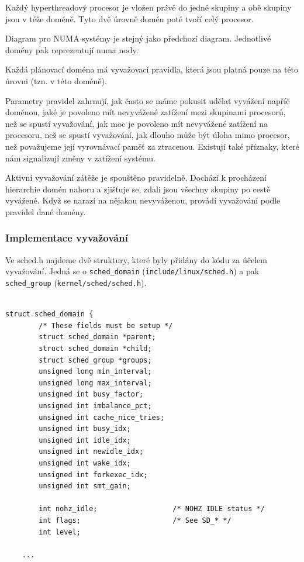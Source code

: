 \documentclass[a4paper,12pt]{article}
\begin{document}
Každý hyperthreadový procesor je vložen právě do jedné skupiny a obě skupiny jsou v téže doméně. Tyto dvě úrovně domén poté tvoří celý procesor. 

Diagram pro NUMA systémy je stejný jako předchozí diagram. Jednotlivé domény pak reprezentují numa nody. 


Každá plánovací doména má vyvažovací pravidla, která jsou platná pouze na této úrovni (tzn. v této doméně). 

Parametry pravidel zahrnují, jak často se máme pokusit udělat vyvážení napříč doménou, jaké je povoleno mít nevyvážené zatížení mezi skupinami procesorů, než se spustí vyvažování, jak moc je povoleno mít nevyvážené zatížení na procesoru, než se spustí vyvažování, jak dlouho může být úloha mimo procesor, než považujeme její vyrovnávací paměť za ztracenou.
Existují také příznaky, které nám signalizují změny v zatížení systému. 

Aktivní vyvažování zátěže je spouštěno pravidelně. Dochází k procházení hierarchie domén nahoru a zjišťuje se, zdali jsou všechny skupiny po cestě vyvážené. Když se narazí na nějakou nevyváženou, provádí vyvažování podle pravidel dané domény.

\subsubsection{Implementace vyvažování}

Ve sched.h najdeme dvě struktury, které byly přidány do kódu za účelem vyvažování. Jedná se o \verb#sched_domain# (\verb#include/linux/sched.h#) a pak \verb#sched_group# (\verb#kernel/sched/sched.h#).

\begin{verbatim} 

struct sched_domain {
        /* These fields must be setup */
        struct sched_domain *parent;
        struct sched_domain *child;
        struct sched_group *groups;
        unsigned long min_interval;
        unsigned long max_interval;
        unsigned int busy_factor;
        unsigned int imbalance_pct;
        unsigned int cache_nice_tries;
        unsigned int busy_idx;
        unsigned int idle_idx;
        unsigned int newidle_idx;
        unsigned int wake_idx;
        unsigned int forkexec_idx;
        unsigned int smt_gain;

        int nohz_idle;                  /* NOHZ IDLE status */
        int flags;                      /* See SD_* */
        int level;

	...

\end{verbatim} 
\end{document}
